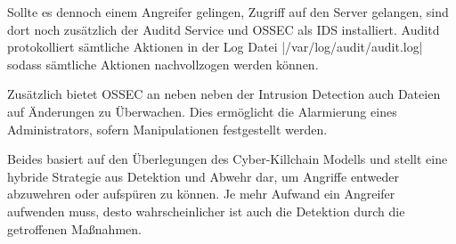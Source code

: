 Sollte es dennoch einem Angreifer gelingen, Zugriff auf den Server gelangen, sind dort noch zusätzlich der Auditd Service und OSSEC als \ac{IDS} installiert. Auditd protokolliert sämtliche Aktionen in der Log Datei |/var/log/audit/audit.log| sodass sämtliche Aktionen nachvollzogen werden können.

Zusätzlich bietet OSSEC an neben neben der Intrusion Detection auch Dateien auf Änderungen zu Überwachen. Dies ermöglicht die Alarmierung eines Administrators, sofern Manipulationen festgestellt werden.


Beides basiert auf den Überlegungen des Cyber-Killchain Modells und stellt eine hybride Strategie aus Detektion und Abwehr dar, um Angriffe entweder abzuwehren oder aufspüren zu können. Je mehr Aufwand ein Angreifer aufwenden muss, desto wahrscheinlicher ist auch die Detektion durch die getroffenen Maßnahmen.